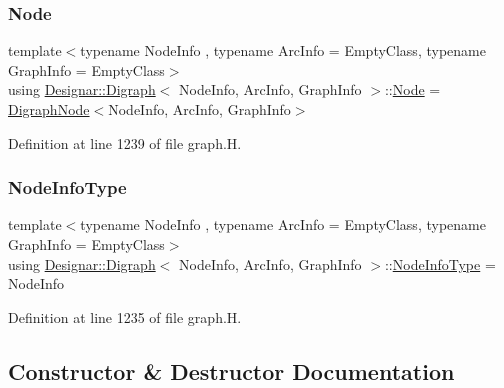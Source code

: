 \subsubsection{\texorpdfstring{Node}{Node}}
{\footnotesize\ttfamily template$<$typename Node\+Info , typename Arc\+Info  = Empty\+Class, typename Graph\+Info  = Empty\+Class$>$ \\
using \hyperlink{class_designar_1_1_digraph}{Designar\+::\+Digraph}$<$ Node\+Info, Arc\+Info, Graph\+Info $>$\+::\hyperlink{class_designar_1_1_digraph_a4dc921c41a480b7946a04170e997d8ae}{Node} =  \hyperlink{class_designar_1_1_digraph_node}{Digraph\+Node}$<$Node\+Info, Arc\+Info, Graph\+Info$>$}



Definition at line 1239 of file graph.\+H.

\mbox{\label{class_designar_1_1_digraph_a6438608ff27cb6f017705e18bd7fc478}} 
\subsubsection{\texorpdfstring{Node\+Info\+Type}{NodeInfoType}}
{\footnotesize\ttfamily template$<$typename Node\+Info , typename Arc\+Info  = Empty\+Class, typename Graph\+Info  = Empty\+Class$>$ \\
using \hyperlink{class_designar_1_1_digraph}{Designar\+::\+Digraph}$<$ Node\+Info, Arc\+Info, Graph\+Info $>$\+::\hyperlink{class_designar_1_1_digraph_a6438608ff27cb6f017705e18bd7fc478}{Node\+Info\+Type} =  Node\+Info}



Definition at line 1235 of file graph.\+H.



\subsection{Constructor \& Destructor Documentation}
\mbox{\label{class_designar_1_1_digraph_ae57ac8513bfcb29602cc08a3d4bc7485}} 
